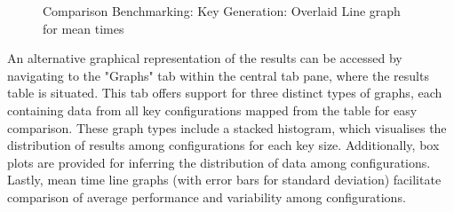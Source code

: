 \documentclass[]{final_report}
\begin{document}
\begin{figure}[H]
\begin{minipage}{0.7\textwidth}
        \centering
       \caption{Comparison Benchmarking: Key Generation: Overlaid Line graph for mean times}
        \label{fig:image2}
    \end{minipage}
\end{figure}
An alternative graphical representation of the results can be accessed by navigating to the "Graphs" tab within the central tab pane, where the results table is situated. This tab offers support for three distinct types of graphs, each containing data from all key configurations mapped from the table for easy comparison. These graph types include a stacked histogram, which visualises the distribution of results among configurations for each key size. Additionally, box plots are provided for inferring the distribution of data among configurations. Lastly, mean time line graphs (with error bars for standard deviation) facilitate comparison of average performance and variability among configurations.
\end{document}
